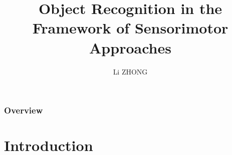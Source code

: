 \documentclass{beamer}
\title[]{Object Recognition in the Framework of Sensorimotor Approaches} %
\author{Li ZHONG} %
\institute[\'Ecole Polytechnique] %
{
Aldebaran Robotics \\ %
\medskip
}
\begin{document}
\begin{frame}
\titlepage %
\end{frame}

\begin{frame}
\frametitle{Overview} %
\tableofcontents %
\end{frame}





\section{Introduction} %
\end{document}
